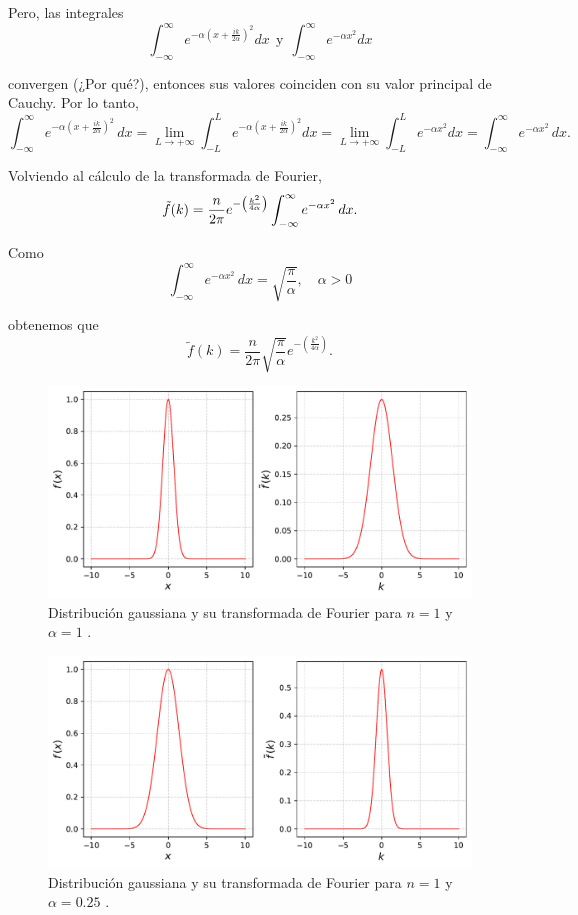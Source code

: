 \begin{ejemplo}
Pero, las integrales
$$\int_{- \infty}^{\infty} e^{-\alpha \left( x + \frac{ik}{2\alpha} \right)^2} dx ~~\mbox{y}~~ \int_{-\infty}^{\infty} e^{-\alpha x^2} dx$$

convergen (¿Por qué?), entonces sus valores coinciden con su valor principal de Cauchy. Por lo tanto,
$$\int_{-\infty}^{\infty} e^{-\alpha \left( x + \frac{ik}{2\alpha} \right)^2} \,dx = \lim_{L \to + \infty} \int_{-L}^L e^{-\alpha \left( x + \frac{ik}{2\alpha} \right)^2} dx = \lim_{L \to + \infty} \int_{-L}^L e^{-\alpha x^2} dx = \int_{-\infty}^{\infty} e^{-\alpha x^2} \,dx.$$

Volviendo al cálculo de la transformada de Fourier,
$$
\Tilde{f}(k) = \frac{n}{2\pi} e^{- \left( \frac{k^2}{4\alpha} \right)} \int_{-\infty}^{\infty} e^{-\alpha x^2} \,dx.
$$

Como
$$\int_{-\infty}^{\infty} e^{-\alpha x^2} \,dx = \sqrt{\frac{\pi}{\alpha}}, \quad \alpha > 0$$

obtenemos que 
$$\tilde{f}(k) = \frac{n}{2\pi}\sqrt{\frac{\pi}{\alpha}}e^{- \left( \frac{k^2}{4\alpha} \right)}.$$

\begin{figure}[H]
    \centering
    \includegraphics[scale = 0.6]{Figuras/EjemploTransformada2.pdf}
    \caption{Distribución gaussiana y su transformada de Fourier para $n=1$ y $\alpha =1$ .}
    \label{Espectro3}
\end{figure}

\begin{figure}[H]
    \centering
    \includegraphics[scale = 0.6]{Figuras/EjemploTransformada3.pdf}
    \caption{Distribución gaussiana y su transformada de Fourier para $n=1$ y $\alpha =0.25$ .}
    \label{Espectro4}
\end{figure}
\end{ejemplo}

